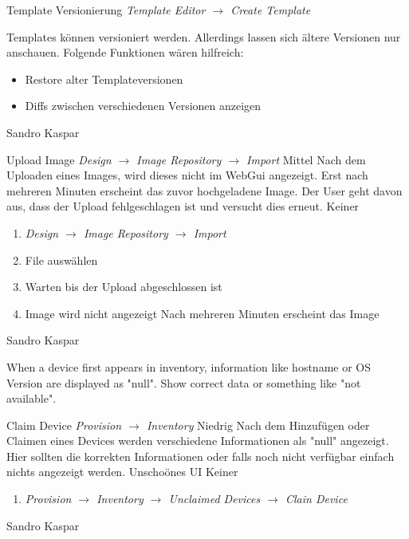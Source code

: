 \featureRequest
{Template Versionierung}
{\textit{Template Editor $\rightarrow$ Create Template}}
{Templates können versioniert werden. Allerdings lassen sich ältere Versionen nur anschauen. Folgende Funktionen wären hilfreich:
\begin{itemize}
	\item Restore alter Templateversionen
	\item Diffs zwischen verschiedenen Versionen anzeigen
\end{itemize}
}
{Sandro Kaspar}
{}

\bugreport
{Upload Image}
{\textit{Design $\rightarrow$ Image Repository $\rightarrow$ Import}}
{Mittel}
{Nach dem Uploaden eines Images, wird dieses nicht im WebGui angezeigt. Erst nach mehreren Minuten erscheint das zuvor hochgeladene Image.
}
{Der User geht davon aus, dass der Upload fehlgeschlagen ist und versucht dies erneut.}
{Keiner}
{
	\begin{enumerate}
		\item \textit{Design $\rightarrow$ Image Repository $\rightarrow$ Import}
		\item File auswählen
		\item Warten bis der Upload abgeschlossen ist
		\item Image wird nicht angezeigt
		\subitem Nach mehreren Minuten erscheint das Image
	\end{enumerate}
}
{Sandro Kaspar}
{}

When a device first appears in inventory, information like hostname or OS Version are displayed as "null". Show correct data or something like "not available".

\bugreport
{Claim Device}
{\textit{Provision $\rightarrow$ Inventory}}
{Niedrig}
{Nach dem Hinzufügen oder Claimen eines Devices werden verschiedene Informationen als "null" angezeigt. Hier sollten die korrekten Informationen oder falls noch nicht verfügbar einfach nichts angezeigt werden.
}
{Unschoönes UI}
{Keiner}
{
	\begin{enumerate}
		\item \textit{Provision $\rightarrow$ Inventory $\rightarrow$ Unclaimed Devices $\rightarrow$ Clain Device}
	\end{enumerate}
}
{Sandro Kaspar}
{}